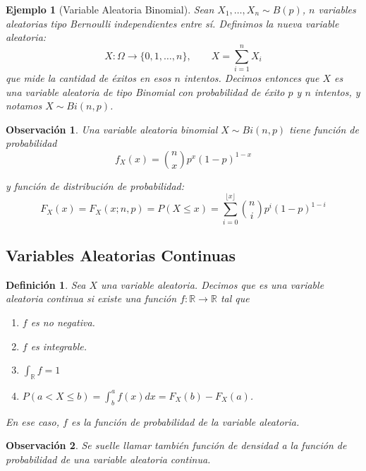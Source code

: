 \documentclass{report}
\newtheorem{dfn}{Definición}[section]
\newtheorem{obs}{Observación}[section]
\newtheorem{ej}{Ejemplo}[section]
\begin{document}
\begin{ej}[Variable Aleatoria Binomial]
    Sean $X_1,\ldots, X_n\sim B(p)$, $n$ variables aleatorias tipo Bernoulli independientes entre sí. Definimos la nueva variable aleatoria:
    \begin{equation*}
        X:\Omega \rightarrow \{0,1,\ldots, n\}, \qquad X=\sum_{i=1}^n X_i
    \end{equation*}
    que mide la cantidad de éxitos en esos $n$ intentos.
    Decimos entonces que $X$ es una variable aleatoria de tipo Binomial con probabilidad de éxito $p$ y $n$ intentos, y notamos $X\sim Bi(n,p)$.
\end{ej}

\begin{obs}
    Una variable aleatoria binomial $X\sim Bi(n,p)$ tiene función de probabilidad
    \begin{equation*}
        f_X(x) = \binom{n}{x} p^x(1-p)^{1-x}
    \end{equation*}

    y función de distribución de probabilidad:
    \begin{equation*}
        F_X(x) = F_X(x; n,p) = P(X\leq x) = \sum_{i=0}^{\lfloor x \rfloor} \binom{n}{i} p^i(1-p)^{1-i}
    \end{equation*}
\end{obs}

\subsection{Variables Aleatorias Continuas}

\begin{dfn}
    Sea $X$ una variable aleatoria. Decimos que es una \emph{variable aleatoria continua} si existe una función $f:\mathbb{R}\rightarrow\mathbb{R}$ tal que
    \begin{enumerate}
        \item $f$ es no negativa.
        \item $f$ es integrable.
        \item $\int_{\mathbb{R}}f = 1$
        \item $P(a<X\leq b) = \int_{b}^{a} f(x)dx = F_X(b)-F_X(a)$.
    \end{enumerate}
    En ese caso, $f$ es la función de probabilidad de la variable aleatoria.
\end{dfn}

\begin{obs}
    Se suelle llamar también \emph{función de densidad} a la función de probabilidad de una variable aleatoria continua.
\end{obs}
\end{document}
